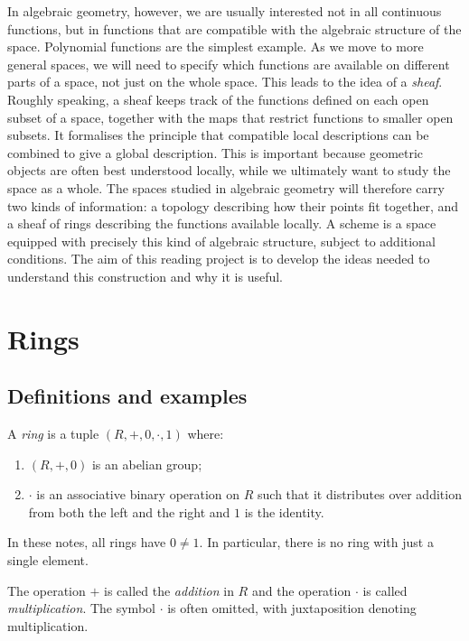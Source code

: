 \documentclass[a4paper,11pt]{article}
\begin{document}
    In algebraic geometry, however, we are usually interested not in all continuous functions, but in functions that are compatible with the algebraic structure of the space. Polynomial functions are the simplest example. As we move to more general spaces, we will need to specify which functions are available on different parts of a space, not just on the whole space. This leads to the idea of a \textit{sheaf}. Roughly speaking, a sheaf keeps track of the functions defined on each open subset of a space, together with the maps that restrict functions to smaller open subsets. It formalises the principle that compatible local descriptions can be combined to give a global description. This is important because geometric objects are often best understood locally, while we ultimately want to study the space as a whole. The spaces studied in algebraic geometry will therefore carry two kinds of information: a topology describing how their points fit together, and a sheaf of rings describing the functions available locally. A scheme is a space equipped with precisely this kind of algebraic structure, subject to additional conditions. The aim of this reading project is to develop the ideas needed to understand this construction and why it is useful.
    
    \section{Rings}
    \subsection{Definitions and examples}
    \begin{definition}
      A \emph{ring} is a tuple \((R, +, 0, \cdot, 1)\) where:
      \begin{enumerate}[label=(\roman*)]
        \item \((R, +, 0)\) is an abelian group;
        \item \(\cdot\) is an associative binary operation on \(R\) such that it distributes over addition from both the left and the right and \(1\) is the identity.
      \end{enumerate}
    \end{definition}

    In these notes, all rings have \(0 \ne 1\). In particular, there is no ring with just a single element.

    The operation \(+\) is called the \emph{addition} in \(R\) and the operation \(\cdot\) is called \emph{multiplication}. The symbol \(\cdot\) is often omitted, with juxtaposition denoting multiplication.
\end{document}
